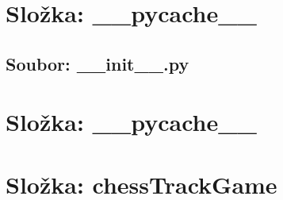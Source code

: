 \documentclass{article}
\begin{document}
\section*{Složka: \_\_pycache\_\_}
\subsection*{Soubor: __init__.py}
\begin{itemize}
\end{itemize}
\section*{Složka: \_\_pycache\_\_}
\section*{Složka: chessTrackGame}
\end{document}
